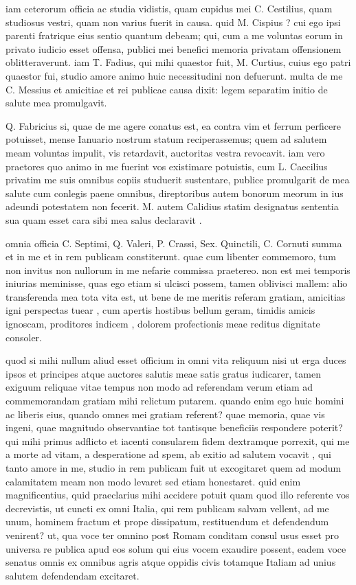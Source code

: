  iam ceterorum officia ac studia vidistis, quam cupidus mei C. Cestilius, quam studiosus vestri, quam non varius fuerit in causa. quid M. Cispius ? cui ego ipsi parenti fratrique eius sentio quantum debeam; qui, cum a me voluntas eorum in privato iudicio esset offensa, publici mei benefici memoria privatam offensionem oblitteraverunt. iam T. Fadius, qui mihi quaestor fuit, M. Curtius, cuius ego patri quaestor fui, studio amore animo huic necessitudini non defuerunt. multa de me C. Messius et amicitiae et rei publicae causa dixit: legem separatim initio de salute mea promulgavit.

 Q. Fabricius si, quae de me agere conatus est, ea contra vim et ferrum perficere potuisset, mense Ianuario nostrum statum reciperassemus; quem ad salutem meam voluntas impulit, vis retardavit, auctoritas vestra revocavit. iam vero praetores quo animo in me fuerint vos existimare potuistis, cum L. Caecilius privatim me suis omnibus copiis studuerit sustentare, publice promulgarit de mea salute cum conlegis paene omnibus, direptoribus autem bonorum meorum in ius adeundi potestatem non fecerit. M. autem Calidius statim designatus sententia sua quam esset cara sibi mea salus declaravit .

 omnia officia C. Septimi, Q. Valeri, P. Crassi, Sex. Quinctili, C. Cornuti summa et in me et in rem publicam constiterunt. quae cum libenter commemoro, tum non invitus non nullorum in me nefarie commissa praetereo. non est mei temporis iniurias meminisse, quas ego etiam si ulcisci possem, tamen oblivisci mallem: alio transferenda mea tota vita est, ut bene de me meritis referam gratiam, amicitias igni perspectas tuear , cum apertis hostibus bellum geram, timidis amicis ignoscam, proditores indicem , dolorem profectionis meae reditus dignitate consoler.

 quod si mihi nullum aliud esset officium in omni vita reliquum nisi ut erga duces ipsos et principes atque auctores salutis meae satis gratus iudicarer, tamen exiguum reliquae vitae tempus non modo ad referendam verum etiam ad commemorandam gratiam mihi relictum putarem. quando enim ego huic homini ac liberis eius, quando omnes mei gratiam referent? quae memoria, quae vis ingeni, quae magnitudo observantiae tot tantisque beneficiis respondere poterit? qui mihi primus adflicto et iacenti consularem fidem dextramque porrexit, qui me a morte ad vitam, a desperatione ad spem, ab exitio ad salutem vocavit , qui tanto amore in me, studio in rem publicam fuit ut excogitaret quem ad modum calamitatem meam non modo levaret sed etiam honestaret. quid enim magnificentius, quid praeclarius mihi accidere potuit quam quod illo referente vos decrevistis, ut cuncti ex omni Italia, qui rem publicam salvam vellent, ad me unum, hominem fractum et prope dissipatum, restituendum et defendendum venirent? ut, qua voce ter omnino post Romam conditam consul usus esset pro universa re publica apud eos solum qui eius vocem exaudire possent, eadem voce senatus omnis ex omnibus agris atque oppidis civis totamque Italiam ad unius salutem defendendam excitaret.

